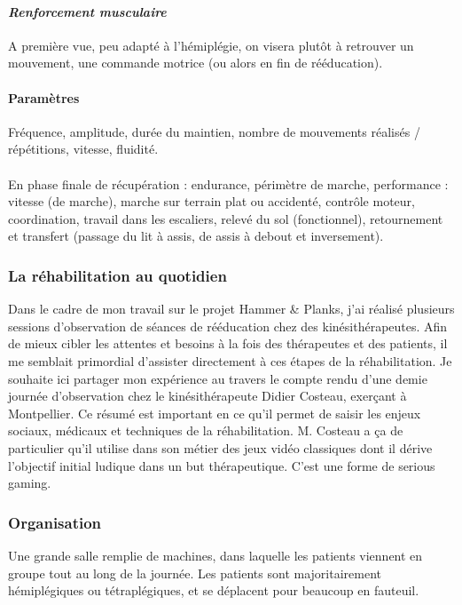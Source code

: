 	\paragraph{\emph{Renforcement musculaire} \\ }
A première vue, peu adapté à l’hémiplégie, on visera plutôt à retrouver un mouvement, une commande motrice (ou alors en fin de rééducation).

	\paragraph{Paramètres \\}
Fréquence, amplitude, durée du maintien, nombre de mouvements réalisés / répétitions, vitesse, fluidité.

\paragraph{}En phase finale de récupération : endurance, périmètre de marche, performance : vitesse (de marche), marche sur terrain plat ou accidenté, contrôle moteur, coordination, travail dans les escaliers, relevé du sol (fonctionnel), retournement et transfert (passage du lit à assis, de assis à debout et inversement).

	\subsubsection{La réhabilitation au quotidien}
Dans le cadre de mon travail sur le projet Hammer \& Planks, j'ai réalisé plusieurs sessions d'observation de séances de rééducation chez des kinésithérapeutes. Afin de mieux cibler les attentes et besoins à la fois des thérapeutes et des patients, il me semblait primordial d'assister directement à ces étapes de la réhabilitation. Je souhaite ici partager mon expérience au travers le compte rendu d'une demie journée d'observation chez le kinésithérapeute Didier Costeau, exerçant à Montpellier. Ce résumé est important en ce qu'il permet de saisir les enjeux sociaux, médicaux et techniques de la réhabilitation. M. Costeau a ça de particulier qu'il utilise dans son métier des jeux vidéo classiques dont il dérive l'objectif initial ludique dans un but thérapeutique. C'est une forme de serious gaming.

	\subsubsection*{Organisation}
Une grande salle remplie de machines, dans laquelle les patients viennent en groupe tout au long de la journée. Les patients sont majoritairement hémiplégiques ou tétraplégiques, et se déplacent pour beaucoup en fauteuil.

